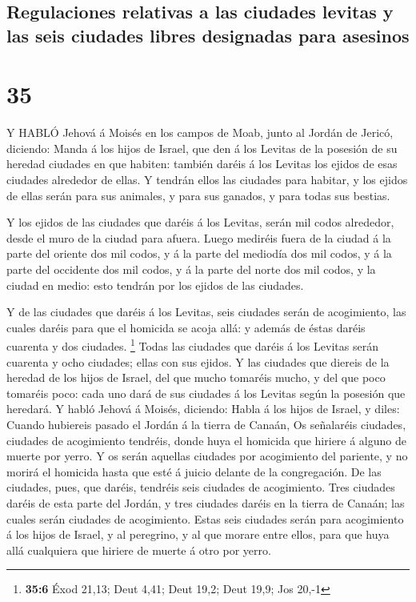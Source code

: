 \hypertarget{regulaciones-relativas-a-las-ciudades-levitas-y-las-seis-ciudades-libres-designadas-para-asesinos}{%
\subsection{Regulaciones relativas a las ciudades levitas y las seis
ciudades libres designadas para
asesinos}\label{regulaciones-relativas-a-las-ciudades-levitas-y-las-seis-ciudades-libres-designadas-para-asesinos}}

\hypertarget{section-34}{%
\section{35}\label{section-34}}

 Y HABLÓ Jehová á Moisés en los campos de Moab, junto al
Jordán de Jericó, diciendo:  Manda á los hijos de Israel,
que den á los Levitas de la posesión de su heredad ciudades en que
habiten: también daréis á los Levitas los ejidos de esas ciudades
alrededor de ellas.  Y tendrán ellos las ciudades para
habitar, y los ejidos de ellas serán para sus animales, y para sus
ganados, y para todas sus bestias.

 Y los ejidos de las ciudades que daréis á los Levitas,
serán mil codos alrededor, desde el muro de la ciudad para afuera.
 Luego mediréis fuera de la ciudad á la parte del oriente
dos mil codos, y á la parte del mediodía dos mil codos, y á la parte del
occidente dos mil codos, y á la parte del norte dos mil codos, y la
ciudad en medio: esto tendrán por los ejidos de las ciudades.

 Y de las ciudades que daréis á los Levitas, seis ciudades
serán de acogimiento, las cuales daréis para que el homicida se acoja
allá: y además de éstas daréis cuarenta y dos ciudades. \footnote{\textbf{35:6}
  Éxod 21,13; Deut 4,41; Deut 19,2; Deut 19,9; Jos 20,-1} 
Todas las ciudades que daréis á los Levitas serán cuarenta y ocho
ciudades; ellas con sus ejidos.  Y las ciudades que diereis
de la heredad de los hijos de Israel, del que mucho tomaréis mucho, y
del que poco tomaréis poco: cada uno dará de sus ciudades á los Levitas
según la posesión que heredará.  Y habló Jehová á Moisés,
diciendo:  Habla á los hijos de Israel, y diles: Cuando
hubiereis pasado el Jordán á la tierra de Canaán,  Os
señalaréis ciudades, ciudades de acogimiento tendréis, donde huya el
homicida que hiriere á alguno de muerte por yerro.  Y os
serán aquellas ciudades por acogimiento del pariente, y no morirá el
homicida hasta que esté á juicio delante de la congregación.
 De las ciudades, pues, que daréis, tendréis seis ciudades
de acogimiento.  Tres ciudades daréis de esta parte del
Jordán, y tres ciudades daréis en la tierra de Canaán; las cuales serán
ciudades de acogimiento.  Estas seis ciudades serán para
acogimiento á los hijos de Israel, y al peregrino, y al que morare entre
ellos, para que huya allá cualquiera que hiriere de muerte á otro por
yerro.

